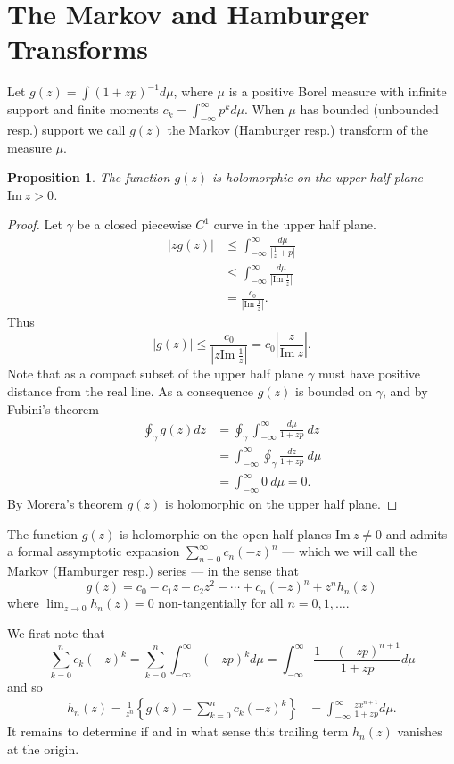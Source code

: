 \documentclass{amsart}
\newtheorem{proposition}[theorem]{Proposition}
\theoremstyle{remark}
\numberwithin{equation}{section}
\newcommand{\im}{\text{Im}~}
\begin{document}
\section{The Markov and Hamburger Transforms}
Let $g(z) = \int (1+zp)^{-1}d\mu$, where $\mu$ is a positive Borel measure with infinite support and finite moments $c_k = \int_{-\infty}^\infty p^k d\mu$. When $\mu$ has bounded (unbounded resp.) support we call $g(z)$ the Markov (Hamburger resp.) transform of the measure $\mu$. 

\begin{proposition}
The function $g(z)$ is holomorphic on the upper half plane $\im z > 0$.
\end{proposition}
\begin{proof}
Let $\gamma$ be a closed piecewise $C^1$ curve in the upper half plane. 
\begin{align*}
    |zg(z)| 
    &\leq \int_{-\infty}^\infty \frac{d\mu}{|\frac1z + p|} \\
    &\leq \int_{-\infty}^\infty \frac{d\mu}{|\im \frac1z|} \\
    &= \frac{c_0}{|\im \frac1z|}.
\end{align*}
Thus
\[
    |g(z)| \leq \frac{c_0}{|z \im \frac1z|} = c_0\left|\frac{z}{\im z}\right|.
\]
Note that as a compact subset of the upper half plane $\gamma$ must have positive distance from the real line. As a consequence $g(z)$ is bounded on $\gamma$, and by Fubini's theorem
\begin{align*}
    \oint_\gamma g(z) dz
    &= \oint_\gamma \int_{-\infty}^\infty \frac{d\mu}{1 + zp} ~dz \\
    &= \int_{-\infty}^\infty \oint_\gamma \frac{dz}{1 + zp} ~d\mu \\
    &= \int_{-\infty}^\infty 0 ~d\mu = 0.
\end{align*}
By Morera's theorem $g(z)$ is holomorphic on the upper half plane.
\end{proof}

The function $g(z)$ is holomorphic on the open half planes $\im z \neq 0$ and admits a formal assymptotic expansion $\sum_{n=0}^\infty c_n(-z)^n$ — which we will call the Markov (Hamburger resp.) series — in the sense that
\begin{equation}
    g(z) = c_0 - c_1z + c_2z^2 - \cdots + c_n(-z)^n + z^n h_n(z) \label{assexp}
\end{equation}
where $\lim_{z \rightarrow 0} h_n(z) = 0$ non-tangentially for all $n = 0, 1, \ldots$.


We first note that 
\[
    \sum_{k=0}^{n} c_k (-z)^k 
    = \sum_{k=0}^{n} \int_{-\infty}^\infty (-zp)^k d\mu
    = \int_{-\infty}^\infty \frac{1 - (-zp)^{n+1}}{1 + zp} d\mu
\]
and so
\begin{align*}
    h_n(z) = \frac1{z^n}\left\{g(z) - \sum_{k=0}^{n} c_k (-z)^k\right\}
    &= \int_{-\infty}^\infty \frac{zx^{n+1}}{1 + zp}d\mu.
\end{align*}
It remains to determine if and in what sense this trailing term $h_n(z)$ vanishes at the origin. 
\end{document}
